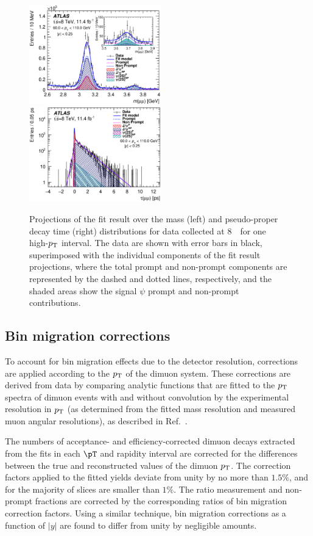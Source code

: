 \begin{figure} [!ht]
  \begin{center} 
   \includegraphics[width=0.51\textwidth]{figures/c_8TeV_c_Mass_23_0.eps}
   \hspace{-0.55cm}
   \includegraphics[width=0.51\textwidth]{figures/c_8TeV_c_Tau_23_0.eps}
      \caption{Projections of the fit result over the mass (left) and pseudo-proper decay time (right) distributions for data collected at $8$~\TeV\ for one high-$\mbox{$p_{\text{T}}$}$ interval. The data are shown with error bars in black, superimposed with the individual components of the fit result projections, where the total prompt and non-prompt components are represented by the dashed and dotted lines, respectively, and the shaded areas show the signal $\psi$ prompt and non-prompt contributions.\label{fig:fitprojmainVIII}}
  \end{center}
\end{figure} 


\subsection{Bin migration corrections}

To account for bin migration effects due to the detector resolution, corrections are applied according to the $\mbox{$p_{\text{T}}$}$ of the dimuon system.
These corrections are derived from data by comparing analytic functions that are 
fitted to the $\mbox{$p_{\text{T}}$}$ spectra of dimuon events with and without
convolution by the experimental resolution in $\mbox{$p_{\text{T}}$}$ (as determined from the fitted mass resolution and measured muon angular resolutions), 
as described in Ref.~\cite{Aad2012dlq}.

The numbers of acceptance- and efficiency-corrected dimuon decays extracted from
the fits in each $\pT$ and rapidity interval are corrected for the differences
between the true and reconstructed values of the dimuon $\mbox{$p_{\text{T}}$}$.
The correction factors applied to the fitted yields deviate from unity by no more than $1.5\%$, and for the majority of slices are smaller than $1\%$.
The ratio measurement and non-prompt fractions are corrected by the corresponding ratios of
bin migration correction factors.
Using a similar technique, bin migration corrections as a function of $|y|$ are found 
to differ from unity by negligible amounts.
